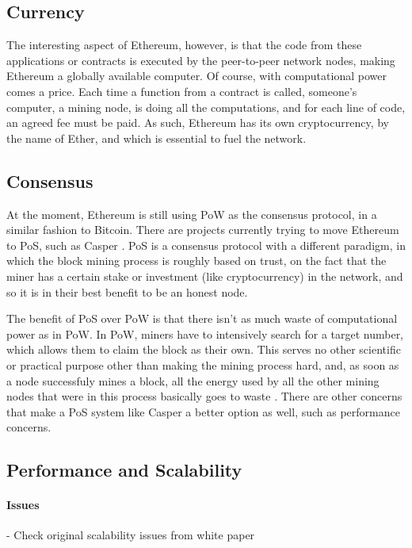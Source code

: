\subsection{Currency}

The interesting aspect of Ethereum, however, is that the code from these applications or contracts is executed by the peer-to-peer network nodes, making Ethereum a globally available computer. Of course, with computational power comes a price. Each time a function from a contract is called, someone's computer, a mining node, is doing all the computations, and for each line of code, an agreed fee must be paid. As such, Ethereum has its own cryptocurrency, by the name of Ether, and which is essential to fuel the network.

\subsection{Consensus}

At the moment, Ethereum is still using PoW as the consensus protocol, in a similar fashion to Bitcoin. There are projects currently trying to move Ethereum to PoS, such as Casper \cite{Buterin2017}. PoS is a consensus protocol with a different paradigm, in which the block mining process is roughly based on trust, on the fact that the miner has a certain stake or investment (like cryptocurrency) in the network, and so it is in their best benefit to be an honest node. 

The benefit of PoS over PoW is that there isn't as much waste of computational power as in PoW. In PoW, miners have to intensively search for a target number, which allows them to claim the block as their own. This serves no other scientific or practical purpose other than making the mining process hard, and, as soon as a node successfuly mines a block, all the energy used  by all the other mining nodes that were in this process basically goes to waste \cite{Buterin2013}. There are other concerns that make a PoS system like Casper a better option as well, such as performance concerns. 

\subsection{Performance and Scalability}

\paragraph{Issues} 
- Check original scalability issues from white paper

